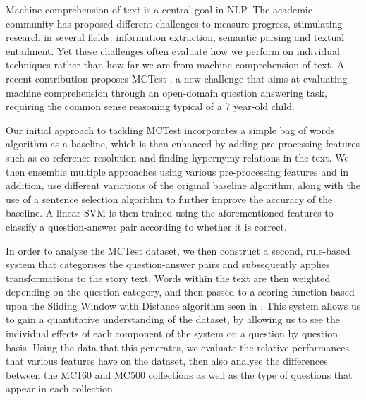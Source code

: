 

Machine comprehension of text is a central goal in NLP. The academic community has proposed different challenges to measure progress, stimulating research in several fields: information extraction, semantic parsing and textual entailment. Yet these challenges often evaluate how we perform on individual techniques rather than how far we are from machine comprehension of text. A recent contribution proposes MCTest \cite{mctest}, a new challenge that aims at evaluating machine comprehension through an open-domain question answering task, requiring the common sense reasoning typical of a 7 year-old child. 

Our initial approach to tackling MCTest incorporates a simple bag of words algorithm as a baseline, which is then enhanced by adding pre-processing features such as co-reference resolution and finding hypernymy relations in the text. We then ensemble multiple approaches using various pre-processing features and in addition, use different variations of the original baseline algorithm, along with the use of a sentence selection algorithm to further improve the accuracy of the baseline. A linear SVM is then trained using the aforementioned features to classify a question-answer pair according to whether it is correct.

In order to analyse the MCTest dataset, we then construct a second, rule-based system that categorises the question-answer pairs and subsequently applies transformations to the story text. Words within the text are then weighted depending on the question category, and then passed to a scoring function based upon the Sliding Window with Distance algorithm seen in \cite{mctest}. This system allows us to gain a quantitative understanding of the dataset, by allowing us to see the individual effects of each component of the system on a question by question basis. Using the data that this generates, we evaluate the relative performances that various features have on the dataset, then also analyse the differences between the MC160 and MC500 collections as well as the type of questions that appear in each collection.